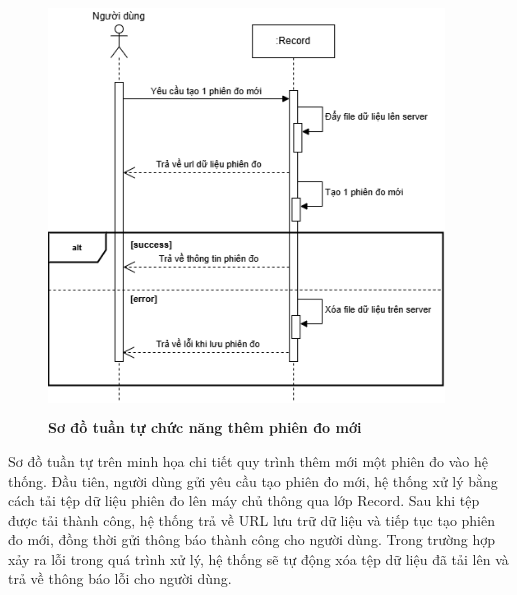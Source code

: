 \begin{figure}[H]
	\centering
	\includegraphics[width=10.5cm,height=11cm]{Images/sequence/record/create.drawio.png}
	\caption[Sơ đồ tuần tự chức năng thêm phiên đo mới]{\bfseries \fontsize{12pt}{0pt}
		\selectfont Sơ đồ tuần tự chức năng thêm phiên đo mới}
	\label{sequence_create_record} %
\end{figure}
Sơ đồ tuần tự trên minh họa chi tiết quy trình thêm mới một phiên đo vào hệ thống. Đầu tiên, người dùng gửi yêu cầu tạo phiên đo mới, hệ thống xử lý bằng cách tải tệp dữ liệu phiên đo lên máy chủ thông qua lớp Record.
Sau khi tệp được tải thành công, hệ thống trả về URL lưu trữ dữ liệu và tiếp tục tạo phiên đo mới, đồng thời gửi thông báo thành công cho người dùng. Trong trường hợp xảy ra lỗi trong quá trình xử lý,
hệ thống sẽ tự động xóa tệp dữ liệu đã tải lên và trả về thông báo lỗi cho người dùng.

